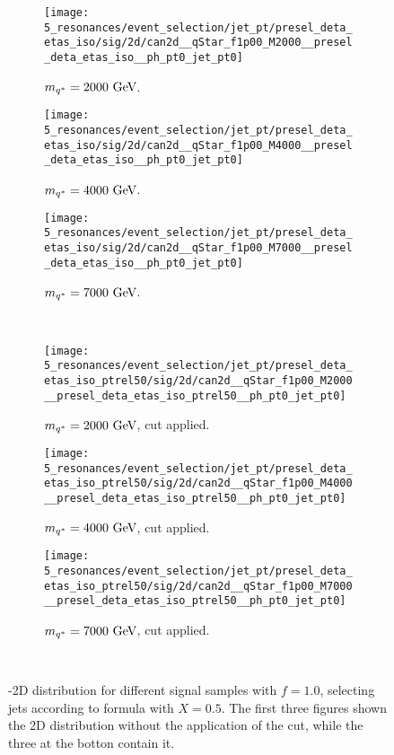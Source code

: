 \begin{figure}[ht!]
    \centering
    \begin{subfigure}[h]{0.32\linewidth}
        \centering
        \texttt{[image: 5\_resonances/event\_selection/jet\_pt/presel\_deta\_etas\_iso/sig/2d/can2d\_\_qStar\_f1p00\_M2000\_\_presel\_deta\_etas\_iso\_\_ph\_pt0\_jet\_pt0]}
        \caption{\(m_{q^*}=2000~\text{GeV}\).}
    \end{subfigure}
    \hfill
    \begin{subfigure}[h]{0.32\linewidth}
        \centering
        \texttt{[image: 5\_resonances/event\_selection/jet\_pt/presel\_deta\_etas\_iso/sig/2d/can2d\_\_qStar\_f1p00\_M4000\_\_presel\_deta\_etas\_iso\_\_ph\_pt0\_jet\_pt0]}
        \caption{\(m_{q^*}=4000~\text{GeV}\).}
    \end{subfigure}
    \hfill
    \begin{subfigure}[h]{0.32\linewidth}
        \centering
        \texttt{[image: 5\_resonances/event\_selection/jet\_pt/presel\_deta\_etas\_iso/sig/2d/can2d\_\_qStar\_f1p00\_M7000\_\_presel\_deta\_etas\_iso\_\_ph\_pt0\_jet\_pt0]}
        \caption{\(m_{q^*}=7000~\text{GeV}\).}
    \end{subfigure}\\
    \begin{subfigure}[h]{0.32\linewidth}
        \centering
        \texttt{[image: 5\_resonances/event\_selection/jet\_pt/presel\_deta\_etas\_iso\_ptrel50/sig/2d/can2d\_\_qStar\_f1p00\_M2000\_\_presel\_deta\_etas\_iso\_ptrel50\_\_ph\_pt0\_jet\_pt0]}
        \caption{\(m_{q^*}=2000~\text{GeV}\), \ptjet cut applied.}
    \end{subfigure}
    \hfill
    \begin{subfigure}[h]{0.32\linewidth}
        \centering
        \texttt{[image: 5\_resonances/event\_selection/jet\_pt/presel\_deta\_etas\_iso\_ptrel50/sig/2d/can2d\_\_qStar\_f1p00\_M4000\_\_presel\_deta\_etas\_iso\_ptrel50\_\_ph\_pt0\_jet\_pt0]}
        \caption{\(m_{q^*}=4000~\text{GeV}\), \ptjet cut applied.}
    \end{subfigure}
    \hfill
    \begin{subfigure}[h]{0.32\linewidth}
        \centering
        \texttt{[image: 5\_resonances/event\_selection/jet\_pt/presel\_deta\_etas\_iso\_ptrel50/sig/2d/can2d\_\_qStar\_f1p00\_M7000\_\_presel\_deta\_etas\_iso\_ptrel50\_\_ph\_pt0\_jet\_pt0]}
        \caption{\(m_{q^*}=7000~\text{GeV}\), \ptjet cut applied.}
    \end{subfigure}\\
    \caption{\ptgam-\ptjet 2D distribution for different \qstar signal samples with \(f=1.0\), selecting jets according to formula \Eqn{\ref{eq:evt_selection:sr_opt:jet_pt:jet_pt_rel_X}} with \(X=0.5\). The first three figures shown the 2D distribution without the application of the \ptjet cut, while the three at the botton contain it.}
    \label{fig:evt_selection:sr_opt:jet_pt:ptgam_ptjet_signals}
\end{figure}



